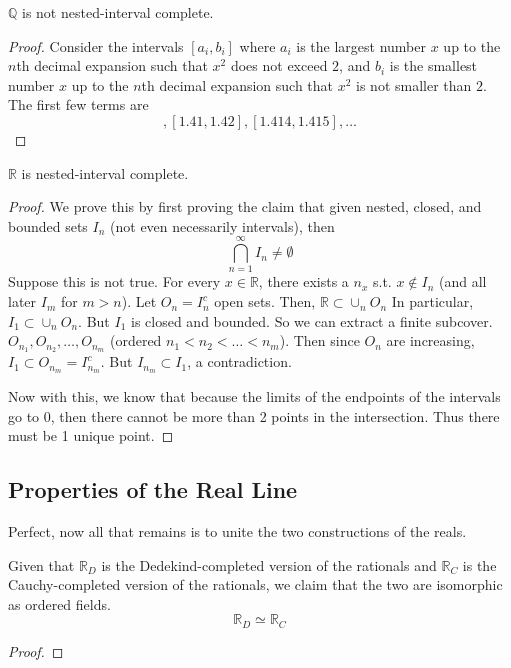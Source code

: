   \begin{theorem}
    $\mathbb{Q}$ is not nested-interval complete. 
  \end{theorem}
  \begin{proof}
    Consider the intervals $[a_i, b_i]$ where $a_i$ is the largest number $x$ up to the $n$th decimal expansion such that $x^2$ does not exceed $2$, and $b_i$ is the smallest number $x$ up to the $n$th decimal expansion such that $x^2$ is not smaller than $2$. The first few terms are 
    \begin{equation}
      [1.4, 1.5], [1.41, 1.42], [1.414, 1.415], \ldots
    \end{equation}
  \end{proof}

  \begin{theorem}
    $\mathbb{R}$ is nested-interval complete. 
  \end{theorem}
  \begin{proof}
    We prove this by first proving the claim that given nested, closed, and bounded sets $I_n$ (not even necessarily intervals), then 
    \begin{equation}
      \bigcap_{n=1}^\infty I_n \neq \emptyset
    \end{equation}
    Suppose this is not true. For every $x \in \mathbb{R}$, there exists a $n_x$ s.t. $x \not\in I_n$ (and all later $I_m$ for $m > n$). Let $O_n = I_n^c$ open sets. Then, $\mathbb{R} \subset \cup_n O_n$ In particular, $I_1 \subset \cup_n O_n$. But $I_1$ is closed and bounded. So we can extract a finite subcover. $O_{n_1}, O_{n_2}, \ldots, O_{n_m}$ (ordered $n_1 < n_2 < \ldots< n_m$). Then since $O_n$ are increasing, $I_1 \subset O_{n_m} = I_{n_m}^c$. But $I_{n_m} \subset I_1$, a contradiction. 

    Now with this, we know that because the limits of the endpoints of the intervals go to $0$, then there cannot be more than 2 points in the intersection. Thus there must be 1 unique point. 
  \end{proof} 

\subsection{Properties of the Real Line}  

  Perfect, now all that remains is to unite the two constructions of the reals. 

  \begin{theorem}
    Given that $\mathbb{R}_D$ is the Dedekind-completed version of the rationals and $\mathbb{R}_C$ is the Cauchy-completed version of the rationals, we claim that the two are isomorphic as ordered fields. 
    \begin{equation}
      \mathbb{R}_D \simeq \mathbb{R}_C
    \end{equation}
  \end{theorem}
  \begin{proof}
    
  \end{proof}

